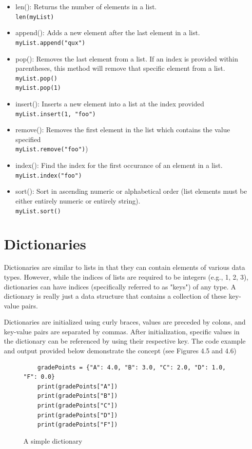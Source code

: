 \documentclass{book}
\begin{document}
\begin{itemize}
	\item len(): Returns the number of elements in a list.
	\\ \texttt{len(myList)}
	\item append(): Adds a new element after the last element in a list.
	\\ \texttt{myList.append("qux")}
	\item pop(): Removes the last element from a list. If an index is provided within parentheses, this method will remove that specific element from a list.
	\\ \texttt{myList.pop() \\ myList.pop(1)}
	\item insert(): Inserts a new element into a list at the index provided 
	\\ \texttt{myList.insert(1, "foo")}
	\item remove(): Removes the first element in the list which contains the value specified 
	\\ \texttt{myList.remove("foo")})
	\item index(): Find the index for the first occurance of an element in a list.
	\\ \texttt{myList.index("foo")}
	\item sort(): Sort in ascending numeric or alphabetical order (list elements must be either entirely numeric or entirely string).
	\\ \texttt{myList.sort()}
\end{itemize}

\section{Dictionaries}
Dictionaries are similar to lists in that they can contain elements of various data types. However, while the indices of lists are required to be integers (e.g., 1, 2, 3), dictionaries can have indices (specifically referred to as "keys") of any type. A dictionary is really just a data structure that contains a collection of these key-value pairs. 

Dictionaries are initialized using curly braces, values are preceded by colons, and key-value pairs are separated by commas. After initialization, specific values in the dictionary can be referenced by using their respective key. The code example and output provided below demonstrate the concept (see Figures 4.5 and 4.6)

\begin{figure}[h]
	\caption{A simple dictionary}
	\begin{lstlisting}
	gradePoints = {"A": 4.0, "B": 3.0, "C": 2.0, "D": 1.0, "F": 0.0}
	print(gradePoints["A"])
	print(gradePoints["B"])
	print(gradePoints["C"])
	print(gradePoints["D"])
	print(gradePoints["F"])
	\end{lstlisting}
\end{figure}
\end{document}
